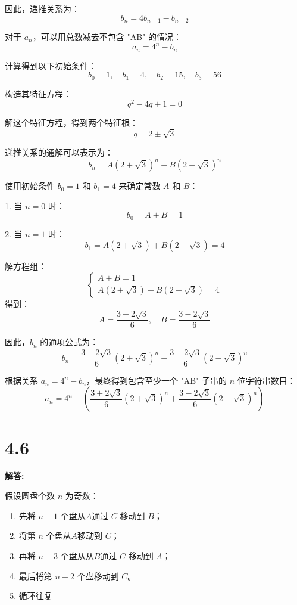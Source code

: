 \documentclass{article}
\begin{document}
因此，递推关系为：
\[
b_n = 4b_{n-1} - b_{n-2}
\]

对于 \( a_n \)，可以用总数减去不包含 "AB" 的情况：
\[
a_n = 4^n - b_n
\]

计算得到以下初始条件：
\[
b_0 = 1, \quad b_1 = 4, \quad b_2 = 15, \quad b_3 = 56
\]

构造其特征方程：
\[
q^2 - 4q + 1 = 0
\]

解这个特征方程，得到两个特征根：
\[
q = 2 \pm \sqrt{3}
\]

递推关系的通解可以表示为：
\[
b_n = A (2 + \sqrt{3})^n + B (2 - \sqrt{3})^n
\]


使用初始条件 \( b_0 = 1 \) 和 \( b_1 = 4 \) 来确定常数 \( A \) 和 \( B \)：

1. 当 \( n = 0 \) 时：
   \[
   b_0 = A + B = 1
   \]

2. 当 \( n = 1 \) 时：
   \[
   b_1 = A(2 + \sqrt{3}) + B(2 - \sqrt{3}) = 4
   \]

解方程组：
\[
\begin{cases}
A + B = 1 \\
A(2 + \sqrt{3}) + B(2 - \sqrt{3}) = 4
\end{cases}
\]
得到：
\[
A = \frac{3 + 2\sqrt{3}}{6}, \quad B = \frac{3 - 2\sqrt{3}}{6}
\]


因此，\( b_n \) 的通项公式为：
\[
b_n = \frac{3 + 2\sqrt{3}}{6} (2 + \sqrt{3})^n + \frac{3 - 2\sqrt{3}}{6} (2 - \sqrt{3})^n
\]

根据关系 \( a_n = 4^n - b_n \)，最终得到包含至少一个 "AB" 子串的 \( n \) 位字符串数目：
\[
\boxed{a_n = 4^n - \left(\frac{3 + 2\sqrt{3}}{6} (2 + \sqrt{3})^n + \frac{3 - 2\sqrt{3}}{6} (2 - \sqrt{3})^n\right)}
\]

\section*{4.6}
\textbf{解答:}

假设圆盘个数 \(n\) 为奇数：

\begin{enumerate}
    \item 先将 \(n-1\) 个盘从\(A\)通过 \(C\) 移动到 \(B\)；
    \item 将第 \(n\) 个盘从\(A\)移动到 \(C\)；
    \item 再将 \(n-3\) 个盘从从\(B\)通过 \(C\) 移动到 \(A\)；
    \item 最后将第 \(n-2\) 个盘移动到 \(C\)。
    \item 循环往复
\end{enumerate}
\end{document}
